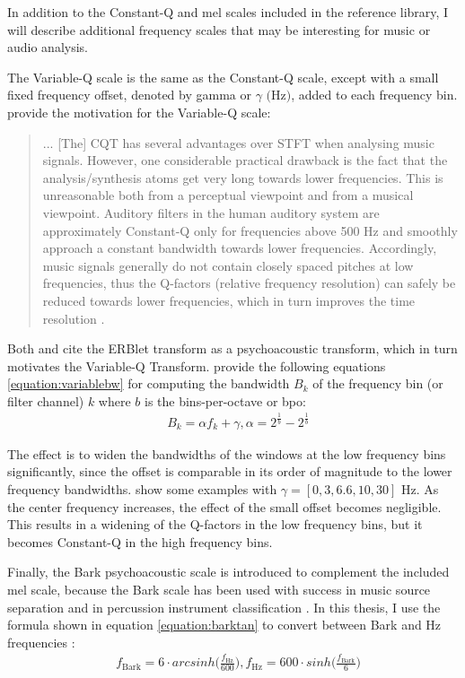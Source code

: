 \documentclass[report.tex]{subfiles}
\begin{document}
In addition to the Constant-Q and mel scales included in the reference library, I will describe additional frequency scales that may be interesting for music or audio analysis.

The Variable-Q scale \parencite{variableq1, variableq2} is the same as the Constant-Q scale, except with a small fixed frequency offset, denoted by gamma or $\gamma \text{ (Hz)}$, added to each frequency bin. \citeauthor{variableq1} provide the motivation for the Variable-Q scale:
\begin{quote}
	... [The] CQT has several advantages over STFT when analysing music signals. However, one considerable practical drawback is the fact that the analysis/synthesis atoms get very long towards lower frequencies. This is unreasonable both from a perceptual viewpoint and from a musical viewpoint. Auditory filters in the human auditory system are approximately Constant-Q only for frequencies above 500 Hz and smoothly approach a constant bandwidth towards lower frequencies. Accordingly, music signals generally do not contain closely spaced pitches at low frequencies, thus the Q-factors (relative frequency resolution) can safely be reduced towards lower frequencies, which in turn improves the time resolution \parencite[5]{variableq1}.
\end{quote}

Both \textcite{variableq1} and \textcite{variableq2} cite the ERBlet transform \parencite{erblet} as a psychoacoustic transform, which in turn motivates the Variable-Q Transform. \textcite{variableq1, variableq2} provide the following equations \eqref{equation:variablebw} for computing the bandwidth $B_{k}$ of the frequency bin (or filter channel) $k$ where $b$ is the bins-per-octave or bpo:
\begin{align}\tag{25}\label{equation:variablebw}
	\nonumber & B_{k} = \alpha f_{k} + \gamma, \alpha = 2^{\frac{1}{b}} - 2^{\frac{1}{b}}
\end{align}

The effect is to widen the bandwidths of the windows at the low frequency bins significantly, since the offset is comparable in its order of magnitude to the lower frequency bandwidths. \textcite{variableq1} show some examples with $\gamma = [0, 3, 6.6, 10, 30] \text{ Hz}$. As the center frequency increases, the effect of the small offset becomes negligible. This results in a widening of the Q-factors in the low frequency bins, but it becomes Constant-Q in the high frequency bins. 

Finally, the Bark psychoacoustic scale is introduced to complement the included mel scale, because the Bark scale has been used with success in music source separation \parencite{barkjust1} and in percussion instrument classification \parencite{barkjust2}. In this thesis, I use the formula shown in equation \eqref{equation:barktan} to convert between Bark and Hz frequencies \parencite{barktan}:
\begin{align}\tag{26}\label{equation:barktan}
	\nonumber & f_{\text{Bark}} = 6 \cdot arcsinh \Big(\frac{f_{\text{Hz}}}{600}\Big), f_{\text{Hz}} = 600 \cdot sinh \Big(\frac{f_{\text{Bark}}}{6}\Big)
\end{align}
\end{document}
